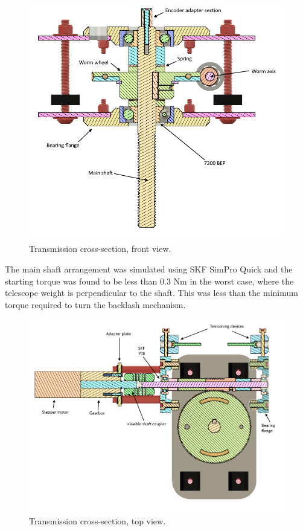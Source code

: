 \begin{figure}[H]
	\centering 
	\includegraphics[scale=0.7]{4-experiment-design/img/mechanical/Gearbox_CS.png}
	\caption{Transmission cross-section, front view.}
	\label{fig::mechanical::gear_cs}
\end{figure}

The main shaft arrangement was simulated using SKF SimPro Quick \cite{SKF} and the starting torque was found to be less than 0.3 Nm in the worst case, where the telescope weight is perpendicular to the shaft. This was less than the minimum torque required to turn the backlash mechanism. 

\begin{figure}[H]
	\centering 
	\includegraphics[scale=0.6]{4-experiment-design/img/mechanical/Wormshaft_CS.png}
	\caption{Transmission cross-section, top view.}
	\label{fig::mechanical::worm_cs}
\end{figure}

